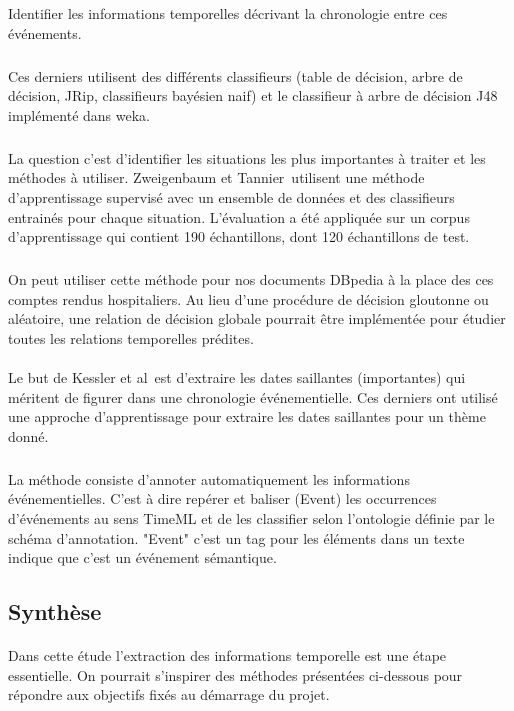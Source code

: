 Identifier les informations temporelles décrivant la chronologie entre ces événements.
\subparagraph{}
Ces derniers utilisent des différents classifieurs (table de décision, arbre de décision, JRip, classifieurs bayésien naif) et le classifieur à arbre de décision J48 implémenté dans weka.
\subparagraph{}
La question c’est d’identifier les situations les plus importantes à traiter et les méthodes à utiliser.
Zweigenbaum et Tannier~\cite{zweigenbaum2013}utilisent une méthode d’apprentissage supervisé avec un ensemble de données et des classifieurs entrainés pour chaque situation. 
L'évaluation a été appliquée sur un corpus d’apprentissage qui contient 190 échantillons, dont 120 échantillons de test.
\subparagraph{}
On peut utiliser cette méthode pour nos documents DBpedia à la place des ces comptes rendus hospitaliers.
Au lieu d’une procédure de décision gloutonne ou aléatoire, une relation de décision globale pourrait être implémentée pour étudier toutes les relations temporelles prédites. 
\paragraph{}
Le but de Kessler et al~\cite{kessler2013}est d'extraire les dates saillantes (importantes) qui méritent de figurer dans une chronologie événementielle.
Ces derniers ont utilisé une approche d’apprentissage pour extraire les dates saillantes pour un thème donné.
\subparagraph{}
La méthode consiste d'annoter automatiquement les informations événementielles. 
C’est à dire repérer et baliser (Event) les occurrences d’événements au sens TimeML et de les classifier selon l’ontologie définie par le schéma d’annotation. 
\newline
"Event" c’est un tag pour les éléments dans un texte indique que c’est un événement sémantique.
\subsection*{Synthèse}
\paragraph{}
Dans cette étude l'extraction des informations temporelle est une étape essentielle. On pourrait s'inspirer des méthodes présentées ci-dessous pour répondre aux objectifs fixés au démarrage du projet.

